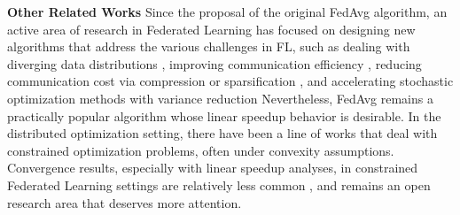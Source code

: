 \textbf{Other Related Works} Since the proposal of the original FedAvg algorithm, an active area of research in Federated Learning has focused on designing new algorithms that address the various challenges in FL, such as dealing with diverging data distributions \cite{sattler2020clustered}, improving communication efficiency \cite{chen2019communication,xu2020ternary,zhu2019multi}, reducing communication cost via compression or sparsification \cite{alistarh2017qsgd,wangni2017gradient,jiang2019improving,li2020acceleration}, and accelerating stochastic optimization methods with variance reduction \cite{horvath2019stochastic,dinh2020federated} Nevertheless, FedAvg remains a practically popular algorithm whose linear speedup behavior is desirable. In the distributed optimization setting, there have been a line of works \cite{liu2016collective,yuan2016convergence,yuan2020stochastic,yuan2018optimal} that deal with constrained optimization problems, often under convexity assumptions. Convergence results, especially with linear speedup analyses, in constrained Federated Learning settings are relatively less common \cite{wang2019adaptive}, and remains an open research area that deserves more attention. 














